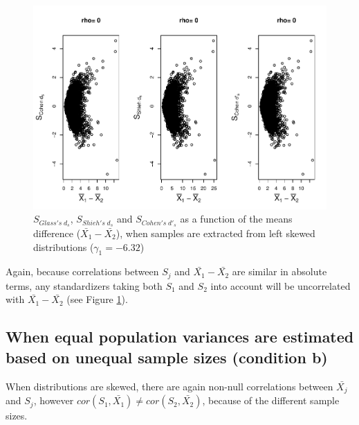 \documentclass[
  man]{apa6}
\begin{document}
\begin{figure}
\centering
\includegraphics{Correlations-between-the-sample-means-difference-and-standardizers-of-all-estimators,-and-implications-on-biases-and-variances-of-all-estimators_files/figure-latex/pltStdzrHombalLskew-1.pdf}
\caption{\label{fig:pltStdzrHombalLskew}\(S_{Glass's \; d_s}\), \(S_{Shieh's \; d_s}\) and \(S_{Cohen's \; d'_s}\) as a function of the means difference (\(\bar{X_1}-\bar{X_2}\)), when samples are extracted from left skewed distributions (\(\gamma_1 = -6.32\))}
\end{figure}

Again, because correlations between \(S_j\) and \(\bar{X_1}-\bar{X_2}\) are similar in absolute terms, any standardizers taking both \(S_1\) and \(S_2\) into account will be uncorrelated with \(\bar{X_1}-\bar{X_2}\) (see Figure \ref{fig:pltStdzrHombalLskew}).

\hypertarget{when-equal-population-variances-are-estimated-based-on-unequal-sample-sizes-condition-b}{%
\subsection{When equal population variances are estimated based on unequal sample sizes (condition b)}\label{when-equal-population-variances-are-estimated-based-on-unequal-sample-sizes-condition-b}}

When distributions are skewed, there are again non-null correlations between \(\bar{X_j}\) and \(S_j\), however \(cor(S_1,\bar{X_1}) \neq cor(S_2,\bar{X_2})\), because of the different sample sizes.
\end{document}
